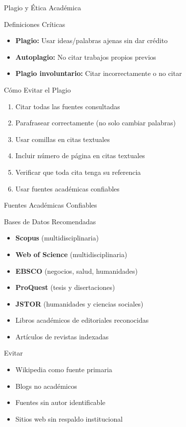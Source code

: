\documentclass[spanish,aspectratio=169]{beamer}
\begin{document}
\begin{frame}{Plagio y Ética Académica}
	\begin{alertblock}{Definiciones Críticas}
		\begin{itemize}
			\item \textbf{Plagio:} Usar ideas/palabras ajenas sin dar crédito
			\item \textbf{Autoplagio:} No citar trabajos propios previos
			\item \textbf{Plagio involuntario:} Citar incorrectamente o no citar
		\end{itemize}
	\end{alertblock}
	
	\begin{block}{Cómo Evitar el Plagio}
		\begin{enumerate}
			\item Citar \alert{todas} las fuentes consultadas
			\item Parafrasear correctamente (no solo cambiar palabras)
			\item Usar comillas en citas textuales
			\item Incluir número de página en citas textuales
			\item Verificar que toda cita tenga su referencia
			\item Usar fuentes académicas confiables
		\end{enumerate}
	\end{block}
\end{frame}

\begin{frame}{Fuentes Académicas Confiables}
	\begin{block}{Bases de Datos Recomendadas}
		\begin{itemize}
			\item \textbf{Scopus} (multidisciplinaria)
			\item \textbf{Web of Science} (multidisciplinaria)
			\item \textbf{EBSCO} (negocios, salud, humanidades)
			\item \textbf{ProQuest} (tesis y disertaciones)
			\item \textbf{JSTOR} (humanidades y ciencias sociales)
			\item Libros académicos de editoriales reconocidas
			\item Artículos de revistas indexadas
		\end{itemize}
	\end{block}
	
	\begin{alertblock}{Evitar}
		\begin{itemize}
			\item Wikipedia como fuente primaria
			\item Blogs no académicos
			\item Fuentes sin autor identificable
			\item Sitios web sin respaldo institucional
		\end{itemize}
	\end{alertblock}
\end{frame}
\end{document}
